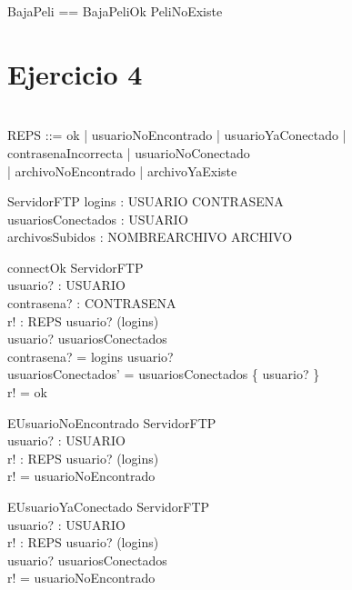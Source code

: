 \documentclass[11pt]{article}
\begin{document}
 \begin{zed}
 BajaPeli == BajaPeliOk \lor PeliNoExiste
 \end{zed}

\section*{Ejercicio 4}

\begin{zed}
   \\
  REPS ::= ok | usuarioNoEncontrado | usuarioYaConectado | contrasenaIncorrecta | usuarioNoConectado \\
        | archivoNoEncontrado | archivoYaExiste
  \end{zed}
  
  \begin{schema}{ServidorFTP}
  logins : USUARIO \pfun CONTRASENA \\ 
  usuariosConectados : \power USUARIO \\
  archivosSubidos : NOMBREARCHIVO \pfun ARCHIVO
  \end{schema}
  
  \begin{schema}{connectOk}
  \Delta ServidorFTP \\
  usuario? : USUARIO \\
  contrasena? : CONTRASENA \\
  r! : REPS
  \where
  usuario? \in (\dom logins) \\
  usuario? \notin usuariosConectados \\
  contrasena? = logins \; usuario? \\
  usuariosConectados' = usuariosConectados \cup \{ usuario? \} \\
  r! = ok
  \end{schema}
  
  \begin{schema}{EUsuarioNoEncontrado}
  \Xi ServidorFTP \\
  usuario? : USUARIO \\
  r! : REPS
  \where
  usuario? \notin (\dom logins) \\
  r! = usuarioNoEncontrado
  \end{schema}
  
  \begin{schema}{EUsuarioYaConectado}
  \Xi ServidorFTP \\
  usuario? : USUARIO \\
  r! : REPS
  \where
  usuario? \in (\dom logins) \\
  usuario? \in usuariosConectados \\
  r! = usuarioNoEncontrado
  \end{schema}
  
\end{document}
